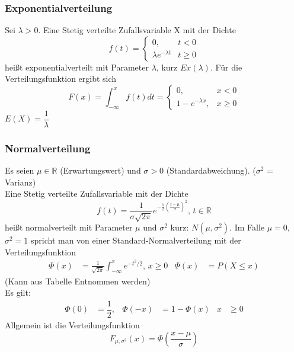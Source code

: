 \documentclass[
	ngerman,
	accentcolor=9c,%
	type=intern,
	marginpar=false
	]{tudapub}
\begin{document}
                \subsubsection*{Exponentialverteilung}
                    Sei $\lambda > 0$. Eine Stetig verteilte Zufallsvariable X mit der Dichte
                    \begin{equation*}
                        f(t)=
                        \begin{cases}
                            0, & t < 0\\
                            \lambda e^{-\lambda t} & t \geq 0
                        \end{cases}
                    \end{equation*}
                    heißt exponentialverteilt mit Parameter $\lambda$, kurz $Ex(\lambda)$.
                    Für die Verteilungsfunktion ergibt sich
                    \begin{equation*}
                        F(x)=\int_{-\infty}^x f(t) dt = 
                        \begin{cases}
                            0,& x <0\\
                            1-e^{-\lambda x}, & x \geq 0
                        \end{cases}
                    \end{equation*}
                    $E(X) = \dfrac{1}{\lambda}$
                \subsubsection*{Normalverteilung}
                    Es seien $\mu \in \mathbb{R}$ (Erwartungswert) und $\sigma > 0$ (Standardabweichung). ($\sigma^2$ = Varianz) \\Eine Stetig verteilte Zufallsvariable mit der Dichte
                    \begin{equation*}
                        f(t)= \dfrac{1}{\sigma \sqrt{2 \pi}}e^{-\frac{1}{2}(\frac{t- \mu}{\sigma})^2}\mbox{, }t \in \mathbb{R}
                    \end{equation*}
                    heißt normalverteilt mit Parameter $\mu$ und $\sigma^2$ kurz: $N(\mu, \sigma^2)$.
                    Im Falle $\mu = 0$, $\sigma^2 =1$ spricht man von einer Standard-Normalverteilung mit der Verteilungsfunktion
                    \begin{align*}
                        \Phi(x) &= \frac{1}{\sqrt{2 \pi}}\int_{-\infty}^x e^{-t^2/2}\mbox{, } x \geq 0 & \Phi(x) &= P(X \leq x)
                    \end{align*}
                    (Kann aus Tabelle Entnommen werden)\\
                    Es gilt:
                    \begin{align*}
                        \Phi(0) &= \dfrac{1}{2}, & \Phi(-x) &= 1- \Phi(x) & x &\geq 0
                    \end{align*}
                    Allgemein ist die Verteilungsfunktion
                    \begin{equation*}
                        F_{\mu, \sigma^2}(x) = \Phi(\dfrac{x-\mu}{\sigma})
                    \end{equation*}
\end{document}

